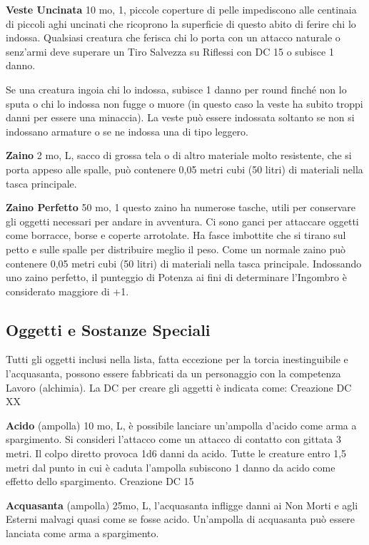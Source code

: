 \documentclass[a4paper,11pt,twoside,openany]{book}
\begin{document}
{\textbf{Veste Uncinata} 10 mo, 1, piccole coperture di pelle impediscono alle centinaia di piccoli aghi uncinati che ricoprono la superficie di questo abito di ferire chi lo indossa. Qualsiasi creatura che ferisca chi lo porta con un attacco naturale o senz'armi deve superare un Tiro Salvezza su Riflessi con DC 15 o subisce 1 danno.

Se una creatura ingoia chi lo indossa, subisce 1 danno per round finché non lo sputa o chi lo indossa non fugge o muore (in questo caso la veste ha subito troppi danni per essere una minaccia). La veste può essere indossata soltanto se non si indossano armature o se ne indossa una di tipo leggero.

\textbf{Zaino} 2 mo, L, sacco di grossa tela o di altro materiale molto resistente, che si porta appeso alle spalle, può contenere 0,05 metri cubi (50 litri) di materiali nella tasca principale. 

\textbf{Zaino Perfetto} 50 mo, 1 questo zaino ha numerose tasche, utili per conservare gli oggetti necessari per andare in avventura. Ci sono ganci per attaccare oggetti come borracce, borse e coperte arrotolate.
Ha fasce imbottite che si tirano sul petto e sulle spalle per distribuire meglio il peso. Come un normale zaino può contenere 0,05 metri cubi (50 litri) di materiali nella tasca principale. Indossando uno zaino perfetto, il punteggio di Potenza ai fini di determinare l'Ingombro è considerato maggiore di +1.

\subsection{Oggetti e Sostanze Speciali}

\label{oggetti-e-sostanze-speciali}

Tutti gli oggetti inclusi nella lista, fatta eccezione per la torcia inestinguibile e l'acquasanta, possono essere fabbricati da un personaggio con la competenza Lavoro (alchimia). La DC per creare gli aggetti è indicata come: Creazione DC XX

\textbf{Acido} (ampolla) 10 mo, L, è possibile lanciare un'ampolla d'acido come arma a spargimento. Si consideri l'attacco come un attacco di contatto con gittata 3 metri. Il colpo diretto provoca 1d6 danni da acido. Tutte le creature entro 1,5 metri dal punto in cui è caduta l'ampolla subiscono 1 danno da acido come effetto dello spargimento.
Creazione DC 15

\textbf{Acquasanta} (ampolla) 25mo, L, l'acquasanta infligge danni ai Non Morti e agli Esterni malvagi quasi come se fosse acido. Un'ampolla di acquasanta può essere lanciata come arma a spargimento.

}
\end{document}
